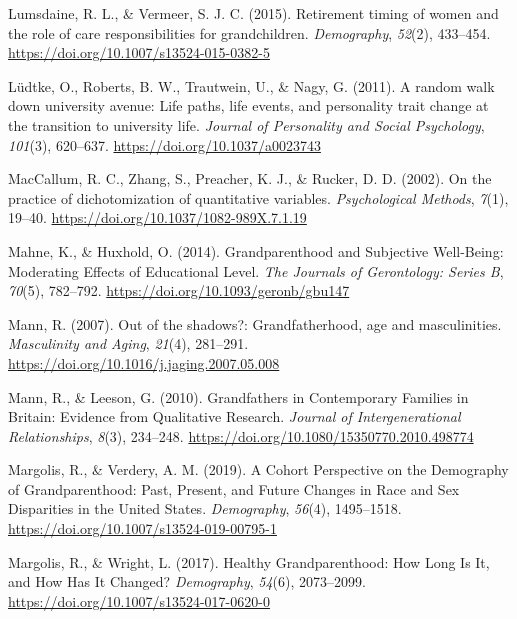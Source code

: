 \documentclass[
  english,
  man, noextraspace]{apa7}
\begin{document}
\leavevmode\hypertarget{ref-lumsdaineRetirementTimingWomen2015}{}%
Lumsdaine, R. L., \& Vermeer, S. J. C. (2015). Retirement timing of women and the role of care responsibilities for grandchildren. \emph{Demography}, \emph{52}(2), 433--454. \url{https://doi.org/10.1007/s13524-015-0382-5}

\leavevmode\hypertarget{ref-ludtkeRandomWalkUniversity2011}{}%
Lüdtke, O., Roberts, B. W., Trautwein, U., \& Nagy, G. (2011). A random walk down university avenue: Life paths, life events, and personality trait change at the transition to university life. \emph{Journal of Personality and Social Psychology}, \emph{101}(3), 620--637. \url{https://doi.org/10.1037/a0023743}

\leavevmode\hypertarget{ref-maccallumPracticeDichotomizationQuantitative2002}{}%
MacCallum, R. C., Zhang, S., Preacher, K. J., \& Rucker, D. D. (2002). On the practice of dichotomization of quantitative variables. \emph{Psychological Methods}, \emph{7}(1), 19--40. \url{https://doi.org/10.1037/1082-989X.7.1.19}

\leavevmode\hypertarget{ref-mahneGrandparenthoodSubjectiveWellBeing2014}{}%
Mahne, K., \& Huxhold, O. (2014). Grandparenthood and Subjective Well-Being: Moderating Effects of Educational Level. \emph{The Journals of Gerontology: Series B}, \emph{70}(5), 782--792. \url{https://doi.org/10.1093/geronb/gbu147}

\leavevmode\hypertarget{ref-mannOutShadowsGrandfatherhood2007}{}%
Mann, R. (2007). Out of the shadows?: Grandfatherhood, age and masculinities. \emph{Masculinity and Aging}, \emph{21}(4), 281--291. \url{https://doi.org/10.1016/j.jaging.2007.05.008}

\leavevmode\hypertarget{ref-mannGrandfathersContemporaryFamilies2010}{}%
Mann, R., \& Leeson, G. (2010). Grandfathers in Contemporary Families in Britain: Evidence from Qualitative Research. \emph{Journal of Intergenerational Relationships}, \emph{8}(3), 234--248. \url{https://doi.org/10.1080/15350770.2010.498774}

\leavevmode\hypertarget{ref-margolisCohortPerspectiveDemography2019}{}%
Margolis, R., \& Verdery, A. M. (2019). A Cohort Perspective on the Demography of Grandparenthood: Past, Present, and Future Changes in Race and Sex Disparities in the United States. \emph{Demography}, \emph{56}(4), 1495--1518. \url{https://doi.org/10.1007/s13524-019-00795-1}

\leavevmode\hypertarget{ref-margolisHealthyGrandparenthoodHow2017}{}%
Margolis, R., \& Wright, L. (2017). Healthy Grandparenthood: How Long Is It, and How Has It Changed? \emph{Demography}, \emph{54}(6), 2073--2099. \url{https://doi.org/10.1007/s13524-017-0620-0}
\end{document}
